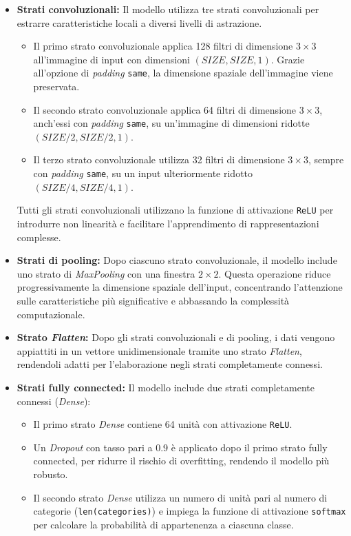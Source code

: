 \begin{itemize}
    \item \textbf{Strati convoluzionali:} 
    Il modello utilizza tre strati convoluzionali per estrarre caratteristiche locali a diversi livelli di astrazione. 
    \begin{itemize}
        \item Il primo strato convoluzionale applica 128 filtri di dimensione $3 \times 3$ all'immagine di input con dimensioni $(SIZE, SIZE, 1)$. Grazie all'opzione di \textit{padding} \texttt{same}, la dimensione spaziale dell'immagine viene preservata. 
        \item Il secondo strato convoluzionale applica 64 filtri di dimensione $3 \times 3$, anch'essi con \textit{padding} \texttt{same}, su un'immagine di dimensioni ridotte $(SIZE/2, SIZE/2, 1)$.
        \item Il terzo strato convoluzionale utilizza 32 filtri di dimensione $3 \times 3$, sempre con \textit{padding} \texttt{same}, su un input ulteriormente ridotto $(SIZE/4, SIZE/4, 1)$.
    \end{itemize}
    Tutti gli strati convoluzionali utilizzano la funzione di attivazione \texttt{ReLU} per introdurre non linearità e facilitare l'apprendimento di rappresentazioni complesse.

    \item \textbf{Strati di pooling:} 
    Dopo ciascuno strato convoluzionale, il modello include uno strato di \textit{MaxPooling} con una finestra $2 \times 2$. Questa operazione riduce progressivamente la dimensione spaziale dell'input, concentrando l'attenzione sulle caratteristiche più significative e abbassando la complessità computazionale.

    \item \textbf{Strato \textit{Flatten}:} 
    Dopo gli strati convoluzionali e di pooling, i dati vengono appiattiti in un vettore unidimensionale tramite uno strato \textit{Flatten}, rendendoli adatti per l'elaborazione negli strati completamente connessi.

    \item \textbf{Strati fully connected:} 
    Il modello include due strati completamente connessi (\textit{Dense}):
    \begin{itemize}
        \item Il primo strato \textit{Dense} contiene 64 unità con attivazione \texttt{ReLU}. 
        \item Un \textit{Dropout} con tasso pari a 0.9 è applicato dopo il primo strato fully connected, per ridurre il rischio di overfitting, rendendo il modello più robusto.
        \item Il secondo strato \textit{Dense} utilizza un numero di unità pari al numero di categorie (\texttt{len(categories)}) e impiega la funzione di attivazione \texttt{softmax} per calcolare la probabilità di appartenenza a ciascuna classe.
    \end{itemize}
\end{itemize}
